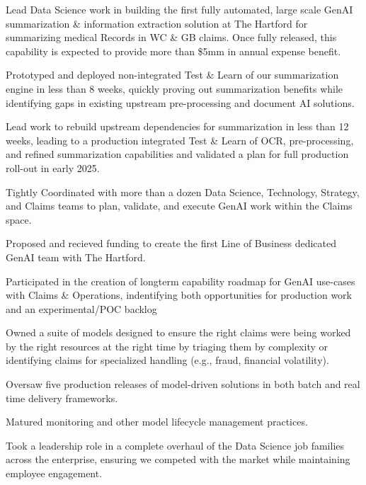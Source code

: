 \documentclass[letterpaper]{deedy-resume} %
\begin{document}
\begin{minipage}[t]{0.68\textwidth}
  \hfill
  \vspace{\topsep}
  \begin{tightitemize}
    \item Lead Data Science work in building the first fully automated, large scale GenAI summarization \&
      information extraction solution at The Hartford for summarizing medical Records in WC \& GB claims.  
      Once fully released, this capability is expected to provide more than \$5mm in annual expense benefit.
    \item Prototyped and deployed non-integrated Test \& Learn of our summarization
      engine in less than 8 weeks, quickly proving out summarization benefits while
      identifying gaps in existing upstream pre-processing and document AI solutions.
    \item Lead work to rebuild upstream dependencies for summarization in less than 12 weeks, 
      leading to a production integrated Test \& Learn of OCR, pre-processing, and refined
      summarization capabilities and validated a plan for full production roll-out in early 2025.
    \item Tightly Coordinated with more than a dozen Data Science, Technology, Strategy, and Claims teams
      to plan, validate, and execute GenAI work within the Claims space.
    \item Proposed and recieved funding to create the first Line of Business dedicated
      GenAI team with The Hartford.
    \item Participated in the creation of longterm capability roadmap for GenAI 
      use-cases with Claims \& Operations, indentifying both opportunities for production 
      work and an experimental/POC backlog
  \end{tightitemize}
  \sectionspace
  
  \hfill
  \begin{tightitemize}
    \item Owned a suite of models designed to ensure the right claims were being worked
      by the right resources at the right time by triaging them by complexity or
      identifying claims for specialized handling (e.g., fraud, financial volatility).
    \item Oversaw five production releases of model-driven solutions in both batch and real time
      delivery frameworks.
    \item Matured monitoring and other model lifecycle management practices.
    \item Took a leadership role in a complete overhaul of the Data Science job families
      across the enterprise, ensuring we competed  with the market while maintaining
      employee engagement.
  \end{tightitemize}
  \sectionspace
  

\end{minipage}
\end{document}
